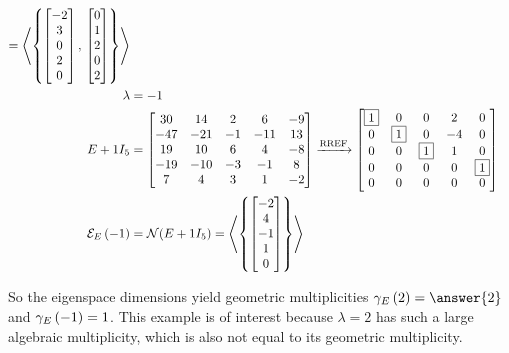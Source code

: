 \documentclass{ximera}
\begin{document}
\begin{example}
\begin{align*}
    =\left\langle\left\{\begin{bmatrix}-2\\3\\0\\2\\0\end{bmatrix},\,\begin{bmatrix}0\\1\\2\\0\\2\end{bmatrix}\right\}\right\rangle\\
    \lambda&=-1\\
    E+1I_5&=
            \begin{bmatrix}
              30 & 14 & 2 & 6 & -9\\
              -47 & -21 & -1 & -11 & 13\\
              19 & 10 & 6 & 4 & -8\\
              -19 & -10 & -3 & -1 & 8\\
              7 & 4 & 3 & 1 & -2
            \end{bmatrix}
                              \xrightarrow{\text{RREF}}
                              \begin{bmatrix}
                                \fbox{1} & 0 & 0 & 2 & 0\\
                                0 & \fbox{1} & 0 & -4 & 0\\
                                0 & 0 & \fbox{1} & 1 & 0\\
                                0 & 0 & 0 & 0 & \fbox{1}\\
                                0 & 0 & 0 & 0 & 0
                              \end{bmatrix}\\
    \mathcal{E}_{E}\left(-1\right)&=\mathcal{N}\!\left(E+1I_5\right)=\left\langle\left\{\begin{bmatrix}-2\\4\\-1\\1\\0\end{bmatrix}\right\}\right\rangle\\
  \end{align*}
  
  So the eigenspace dimensions yield geometric multiplicities
  $\geomult{E}{2}=\answer{2}$ and $\gamma_{E}\left(-1\right)=1$.  This example
  is of interest because $\lambda=2$ has such a large algebraic
  multiplicity, which is also not equal to its geometric multiplicity.

\end{example}
\end{document}

